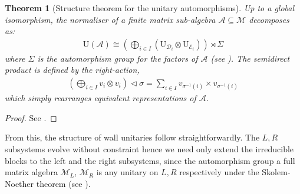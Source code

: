 \documentclass[11pt, twocolumn, floatfix, superscriptaddress, aps, prb, raggedbottom]{revtex4-2}
\newtheorem{theorem}{Theorem}[section]
\begin{document}
\begin{theorem}[Structure theorem for the unitary automorphisms]
Up to a global isomorphism, the normaliser of a finite matrix sub-algebra $\mathcal{A}\subseteq\mathcal{M}$ decomposes as:
   \begin{align}
    \mathrm{U}(\mathcal{A}) \cong \left( \bigoplus_{i \in I} \left(\mathrm{U}_{\mathcal{D}_i} \otimes \mathrm{U}_{\mathcal{E}_i} \right)\right) \rtimes \Sigma
  \end{align}
  where $\Sigma$ is the automorphism group for the factors of $\mathcal{A}$ (see ). The semidirect product is defined by the right-action,
  \begin{align}
    \left(\bigoplus_{i \in I} v_i \otimes v_i\right) \triangleleft \sigma = \sum_{i \in I} v_{\sigma^{-1}(i)} \times v_{\sigma^{-1}(i)}
  \end{align}
  which simply rearranges equivalent representations of $\mathcal{A}$.
  \label{thm:wall_structure}
\end{theorem}
\begin{proof}
    See .
\end{proof}

From this, the structure of wall unitaries follow straightforwardly. The $L, R$ subsystems evolve without constraint hence we need only extend the irreducible blocks to the left and the right subsystems, since the automorphism group a full matrix algebra $\mathcal{M}_L$, $\mathcal{M}_R$ is any unitary on $L, R$ respectively under the Skolem-Noether theorem (see ).
\end{document}
